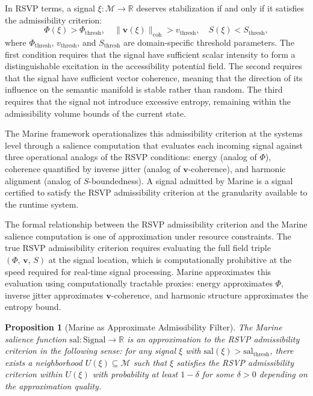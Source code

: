 \documentclass[12pt, a4paper, openany]{book}
\theoremstyle{plain}
\newtheorem{proposition}[theorem]{Proposition}
\theoremstyle{definition}
\theoremstyle{remark}
\newcommand{\vvec}{\mathbf{v}}
\newcommand{\Sfield}{S}
\newcommand{\RSVPtriple}{(\Phi,\,\vvec,\,\Sfield)}
\begin{document}
In RSVP terms, a signal $\xi: \mathcal{M} \to \mathbb{R}$ deserves stabilization if and only if it satisfies the admissibility criterion:
\[
\Phi(\xi) > \Phi_{\mathrm{thresh}},\quad \|\vvec(\xi)\|_{\mathrm{coh}} > v_{\mathrm{thresh}},\quad \Sfield(\xi) < \Sfield_{\mathrm{thresh}},
\]
where $\Phi_{\mathrm{thresh}}$, $v_{\mathrm{thresh}}$, and $\Sfield_{\mathrm{thresh}}$ are domain-specific threshold parameters. The first condition requires that the signal have sufficient scalar intensity to form a distinguishable excitation in the accessibility potential field. The second requires that the signal have sufficient vector coherence, meaning that the direction of its influence on the semantic manifold is stable rather than random. The third requires that the signal not introduce excessive entropy, remaining within the admissibility volume bounds of the current state.

The Marine framework operationalizes this admissibility criterion at the systems level through a salience computation that evaluates each incoming signal against three operational analogs of the RSVP conditions: energy (analog of $\Phi$), coherence quantified by inverse jitter (analog of $\vvec$-coherence), and harmonic alignment (analog of $\Sfield$-boundedness). A signal admitted by Marine is a signal certified to satisfy the RSVP admissibility criterion at the granularity available to the runtime system.

The formal relationship between the RSVP admissibility criterion and the Marine salience computation is one of approximation under resource constraints. The true RSVP admissibility criterion requires evaluating the full field triple $\RSVPtriple$ at the signal location, which is computationally prohibitive at the speed required for real-time signal processing. Marine approximates this evaluation using computationally tractable proxies: energy approximates $\Phi$, inverse jitter approximates $\vvec$-coherence, and harmonic structure approximates the entropy bound.

\begin{proposition}[Marine as Approximate Admissibility Filter]
The Marine salience function $\mathrm{sal}: \mathrm{Signal} \to \mathbb{R}$ is an approximation to the RSVP admissibility criterion in the following sense: for any signal $\xi$ with $\mathrm{sal}(\xi) > \mathrm{sal}_{\mathrm{thresh}}$, there exists a neighborhood $U(\xi) \subseteq \mathcal{M}$ such that $\xi$ satisfies the RSVP admissibility criterion within $U(\xi)$ with probability at least $1 - \delta$ for some $\delta > 0$ depending on the approximation quality.
\end{proposition}
\end{document}
